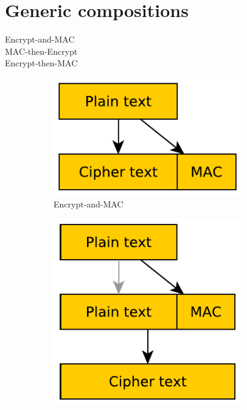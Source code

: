 \section{Generic compositions}

\begin{description}
  \item[Encrypt-and-MAC]
  \item[MAC-then-Encrypt]
  \item[Encrypt-then-MAC]
\end{description}

\begin{figure}
  \centering
  \begin{subfigure}[b]{0.3\textwidth}
    \centering
    \includegraphics[width=0.9\textwidth]{images/encrypt-and-mac.pdf}
    \caption{Encrypt-and-MAC}
  \end{subfigure}
  \begin{subfigure}[b]{0.3\textwidth}
    \centering
    \includegraphics[width=0.9\textwidth]{images/mac-then-encrypt.pdf}

\end{subfigure}
\end{figure}
